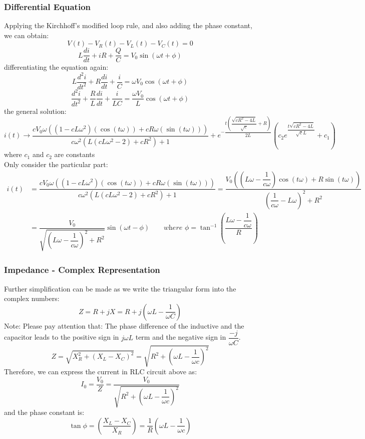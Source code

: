 \documentclass[UTF8]{article}
\begin{document}
\subsubsection{Differential Equation}
Applying the Kirchhoff's modified loop rule, and also adding the phase constant, we can obtain:
$$V(t)-V_R(t)-V_L(t)-V_C(t)=0$$
$$L\dfrac{di}{dt}+iR+\dfrac{Q}{C}=V_0\sin (\omega t+\phi )$$
differentiating the equation again:
$$L\dfrac{d^2i}{dt^2}+R\dfrac{di}{dt}+\dfrac{i}{C}=\omega V_0\cos (\omega t+\phi)$$
$$\dfrac{d^2i}{dt^2}+\dfrac{R}{L}\dfrac{di}{dt}+\dfrac{i}{LC}=\dfrac{\omega V_0}{L}\cos (\omega t+\phi)$$
the general solution:
$$i(t) \to \dfrac{c V_0 \omega  \left(\left(1-c L \omega ^2\right) (\cos  (t \omega ))+c R \omega  (\sin  (t \omega ))\right)}{c \omega ^2 \left(L \left(c L \omega ^2-2\right)+c R^2\right)+1}+e^{-\dfrac{t \left(\dfrac{\sqrt{c R^2-4 L}}{\sqrt{c}}+R\right)}{2 L}} \left(c_2 e^{\dfrac{t \sqrt{c R^2-4 L}}{\sqrt{c} L}}+c_1\right)$$
where $c_1$ and $c_2$ are constants\\
Only consider the particular part:
\begin{align*}
i(t) &= \dfrac{c V_0 \omega  \left(\left(1-c L \omega ^2\right) (\cos  (t \omega ))+c R \omega  (\sin  (t \omega ))\right)}{c \omega ^2 \left(L \left(c L \omega ^2-2\right)+c R^2\right)+1}
=\dfrac{V_0 \left(\left(L \omega -\dfrac{1}{c \omega }\right) \cos (t \omega )+R \sin (t \omega )\right)}{\left(\dfrac{1}{c \omega }-L \omega \right)^2+R^2}\\
&= \dfrac{V_0}{\sqrt{\left(L \omega -\dfrac{1}{c \omega }\right)^2+R^2}}\sin (\omega t -\phi ) \qquad \textit{where }\phi=\tan^{-1}\left(\dfrac{L \omega -\dfrac{1}{c \omega }}{R}\right)
\end{align*}

\subsubsection{Impedance - Complex Representation}
Further simplification can be made as we write the triangular form into the complex numbers:
$$Z=R+jX=R+j(\omega L-\dfrac{1}{\omega C})$$
Note: Please pay attention that:
The phase difference of the inductive and the capacitor leads to the positive sign in $j\omega L$ term and the negative sign in $\dfrac{-j}{\omega C}$.  
$$Z=\sqrt{X_R^2+(X_L-X_C)^2}=\sqrt{R^2+(\omega L-\frac{1}{\omega c})^2}$$
Therefore, we can express the current in RLC circuit above as:
$$I_0=\dfrac{V_0}{Z}=\dfrac{V_0}{\sqrt{R^2+(\omega L-\dfrac{1}{\omega c})^2}}$$
and the phase constant is:
$$\tan \phi =\left(\dfrac{X_L-X_C}{X_R}\right)=\dfrac{1}{R}\left(\omega L-\dfrac{1}{\omega c}\right)$$
\end{document}
